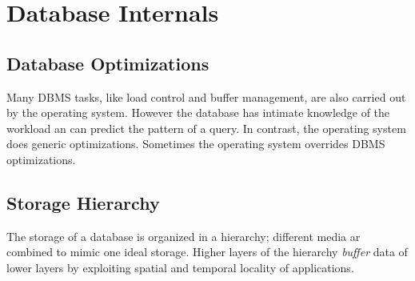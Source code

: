 

\section{Database Internals}




\subsection{Database Optimizations}


Many DBMS tasks, like load control and buffer management, are also carried out by the operating system. However the database has intimate knowledge of the workload an can predict the pattern of a query. In contrast, the operating system does generic optimizations. Sometimes the operating system overrides DBMS optimizations.




\subsection{Storage Hierarchy}


The storage of a database is organized in a hierarchy; different media ar combined to mimic one ideal storage. Higher layers of the hierarchy \textit{buffer} data of lower layers by exploiting spatial and temporal locality of applications.

